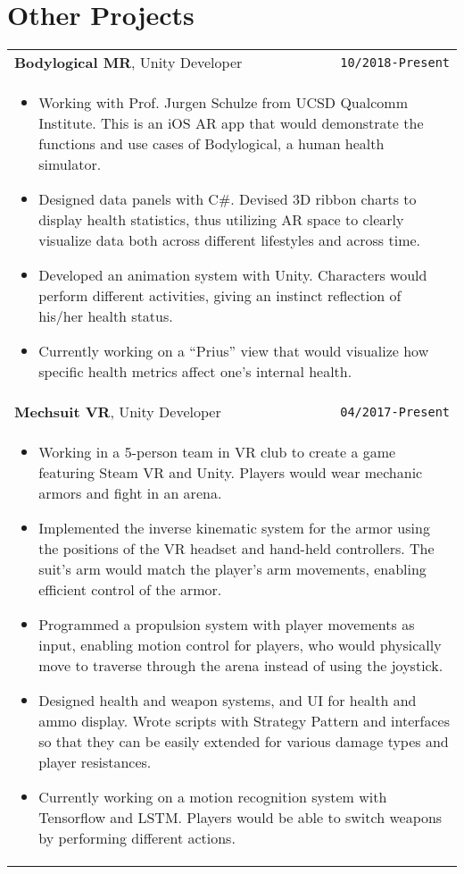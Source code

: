 \documentclass[10pt, letterpaper]{article}
\newcommand{\itemcols}[1]{
	\multicolumn{2}{p{\dimexpr \linewidth-2\tabcolsep}}{
	\begin{itemize}
		#1
	\end{itemize}
	}
}
\begin{document}
\section{Other Projects}
\smallskip
\noindent
\begin{tabularx}{\linewidth}{X r}
	\textbf{\large Bodylogical MR}, Unity Developer & \texttt{10/2018-Present} \\
	\itemcols{		
		\item Working with Prof. Jurgen Schulze from UCSD Qualcomm Institute. This is an iOS AR app that would demonstrate the functions and use cases of Bodylogical, a human health simulator.
		\item Designed data panels with C\#. Devised 3D ribbon charts to display health statistics, thus utilizing AR space to clearly visualize data both across different lifestyles and across time.
		\item Developed an animation system with Unity. Characters would perform different activities, giving an instinct reflection of his/her health status.
		\item Currently working on a ``Prius'' view that would visualize how specific health metrics affect one's internal health.
	} \\
	
	\textbf{\large Mechsuit VR}, Unity Developer & \texttt{04/2017-Present} \\
	\itemcols{
		\item Working in a 5-person team in VR club to create a game featuring Steam VR and Unity. Players would wear mechanic armors and fight in an arena.
		\item Implemented the inverse kinematic system for the armor using the positions of the VR headset and hand-held controllers. The suit's arm would match the player's arm movements, enabling efficient control of the armor.
		\item Programmed a propulsion system with player movements as input, enabling motion control for players, who would physically move to traverse through the arena instead of using the joystick.
		\item Designed health and weapon systems, and UI for health and ammo display. Wrote scripts with Strategy Pattern and interfaces so that they can be easily extended for various damage types and player resistances.
		\item Currently working on a motion recognition system with Tensorflow and LSTM. Players would be able to switch weapons by performing different actions.
	} \\
	

\end{tabularx}
\end{document}
